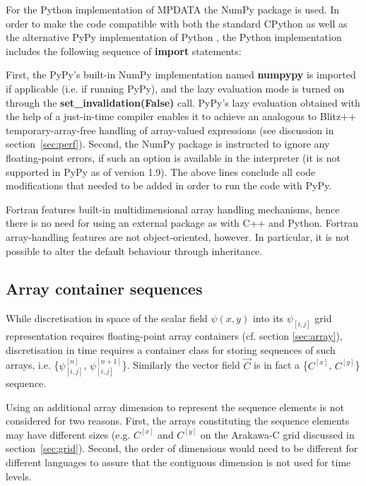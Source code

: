 \documentclass[final,5p,times,twocolumn]{elsarticle}
\newcounter{lstnopyt}
\newcounter{linenopyt}
\newcommand*\FancyVerbStartString{}
\newcommand*\FancyVerbStopString{}
\newcommand{\codepyt}[4]{%
  \addtocounter{lstnopyt}{1}%
  \renewcommand*\FancyVerbStartString{\PY{c}{\PYZsh{}#2}}
  \renewcommand*\FancyVerbStopString{\PY{c}{\PYZsh{}#3}}
  \setcounter{FancyVerbLine}{\thelinenopyt}%
  \fvset{label={listing~P.\thelstnopyt~(Python)},rulecolor=\color{blue},stepnumber=#4}%
  \setcounter{linenopyt}{\value{FancyVerbLine}}%
}
\newcommand{\prog}[1]{{\rm\bf#1}}
\begin{document}
  For the Python implementation of MPDATA the NumPy package is used.
  In order to make the code compatible with both the standard CPython
    as well as the alternative PyPy implementation of Python \citep[][]{Bolz_et_al_2011},
    the Python implementation includes the following sequence of \prog{import} statements:
  \codepyt{code/pyt/listings.py}{listing02}{listing03}{1}
  First, the PyPy's built-in NumPy implementation named \prog{numpypy} is imported if applicable (i.e. if running PyPy), 
    and the lazy evaluation mode is turned on through the \prog{set\_invalidation(False)} call.
  PyPy's lazy evaluation obtained with the help of a just-in-time compiler enables it to achieve
    an analogous to Blitz++ temporary-array-free handling of array-valued expressions 
    (see discussion in section~\ref{sec:perf}).
  Second, the NumPy package is instructed to ignore any floating-point errors, if such an option
    is available in the interpreter (it is not supported in PyPy as of version 1.9).
  The above lines conclude all code modifications that needed to be added in order to run
    the code with PyPy.

  Fortran features built-in multidimensional array handling mechanisms,
    hence there is no need for using an external package as with C++ and Python.
  Fortran array-handling features are not object-oriented, however.
  In particular, it is not possible to alter the default behaviour through
    inheritance.

  \subsection{Array container sequences}\label{sec:sequence}

  While discretisation in space of the scalar field $\psi(x,y)$ into its $\psi_{[i,j]}$ 
    grid representation requires floating-point array containers (cf. section \ref{sec:array}), 
    discretisation in time requires a container class for storing
    sequences of such arrays, i.e. \{$\psi_{[i,j]}^{[n]}$, $\psi_{[i,j]}^{[n+1]}$\}.
  Similarly the vector field $\vec{C}$ is in fact a \{$C^{[x]}$, $C^{[y]}$\} sequence.
 
  Using an additional array dimension to represent the sequence elements is not considered for two reasons.
  First, the arrays constituting the sequence elements may have different sizes
      (e.g.  $C^{[x]}$ and $C^{[y]}$ on the Arakawa-C grid discussed in section~\ref{sec:grid}).
  Second, the order of dimensions would need to be different for different languages to assure that
      the contiguous dimension is not used for time levels.
\end{document}
